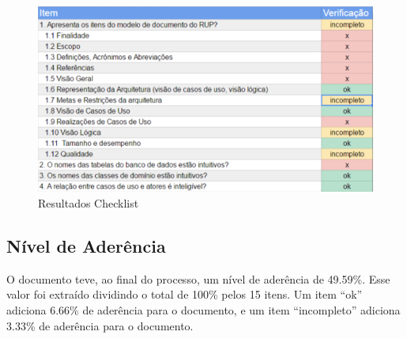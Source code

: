 \begin{figure}[H]
  \center
  \includegraphics[width=1\textwidth]{figuras/checklist-results.png}
  \caption{Resultados Checklist}
  \label{fig:checklist-results}
\end{figure}

 \subsection{Nível de Aderência}

O documento teve, ao final do processo, um nível de aderência de 49.59\%. Esse
valor foi extraído dividindo o total de 100\% pelos 15 itens. Um item ``ok''
adiciona 6.66\% de aderência para o documento, e um item ``incompleto'' adiciona
3.33\% de aderência para o documento.
